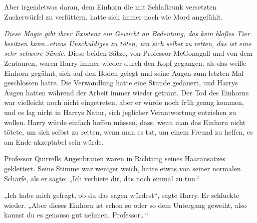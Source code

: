 Aber irgendetwas daran, dem Einhorn die mit Schlaftrunk versetzten Zuckerwürfel zu verfüttern, hatte sich immer noch wie Mord angefühlt.

\emph{Diese Magie gibt ihrer Existenz ein Gewicht an Bedeutung, das kein bloßes Tier besitzen kann…etwas Unschuldiges zu töten, um sich selbst zu retten, das ist eine sehr schwere Sünde.}
Diese beiden Sätze, von Professor McGonagall und von dem Zentauren, waren Harry immer wieder durch den Kopf gegangen, als das weiße Einhorn gegähnt, sich auf den Boden gelegt und seine Augen zum letzten Mal geschlossen hatte. Die Verwandlung hatte eine Stunde gedauert, und Harrys Augen hatten während der Arbeit immer wieder getränt. Der Tod des Einhorns war vielleicht noch nicht eingetreten, aber er würde noch früh genug kommen, und es lag nicht in Harrys Natur, sich jeglicher Verantwortung entziehen zu wollen. Harry würde einfach hoffen müssen, dass, wenn man das Einhorn nicht tötete, um sich selbst zu retten, wenn man es tat, um einem Freund zu helfen, es am Ende akzeptabel sein würde.

Professor Quirrells Augenbrauen waren in Richtung seines Haaransatzes geklettert. Seine Stimme war weniger weich, hatte etwas von seiner normalen Schärfe, als er sagte: „Ich verbiete dir, das noch einmal zu tun.“

„Ich habe mich gefragt, ob du das sagen würdest“, sagte Harry.
Er schluckte wieder.
„Aber dieses Einhorn ist schon so oder so dem Untergang geweiht, also kannst du es genauso gut nehmen, Professor…“

